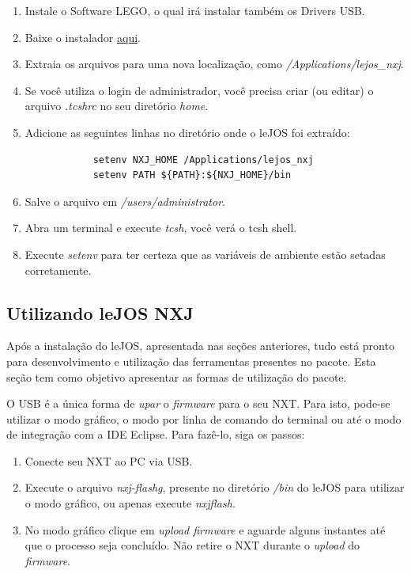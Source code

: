 	\begin{enumerate}
		\item Instale o Software LEGO, o qual irá instalar também os Drivers USB.
		\item Baixe o instalador \href{www.lejos.org}{aqui}.
		\item Extraia os arquivos para uma nova localização, como \textit{/Applications/lejos\_nxj}.
		\item Se você utiliza o login de administrador, você precisa criar (ou editar) o arquivo \textit{.tcshrc} no seu diretório \textit{home}.
		\item Adicione as seguintes linhas no diretório onde o leJOS foi extraído:
		\begin{lstlisting}
			setenv NXJ_HOME /Applications/lejos_nxj
			setenv PATH ${PATH}:${NXJ_HOME}/bin
		\end{lstlisting}
		\item Salve o arquivo em \textit{/users/administrator}.
		\item Abra um terminal e execute \textit{tcsh}, você verá o tcsh shell.
		\item Execute \textit{setenv} para ter certeza que as variáveis de ambiente estão setadas corretamente.
	\end{enumerate}

\subsection{Utilizando leJOS NXJ} %
\label{sub:utilizando_lejos_nxj}

	Após a instalação do leJOS, apresentada nas seções anteriores, tudo está pronto para desenvolvimento e utilização das ferramentas presentes no pacote. Esta seção tem como objetivo apresentar as formas de utilização do pacote.

	O USB é a única forma de \textit{upar} o \textit{firmware} para o seu NXT. Para isto, pode-se utilizar o modo gráfico, o modo por linha de comando do terminal ou até o modo de integração com a IDE Eclipse. Para fazê-lo, siga os passos:

	\begin{enumerate}
		\item Conecte seu NXT ao PC via USB.
		\item Execute o arquivo \textit{nxj-flashg}, presente no diretório \textit{/bin} do leJOS para utilizar o modo gráfico, ou apenas execute \textit{nxjflash}.
		\item No modo gráfico clique em \textit{upload firmware} e aguarde alguns instantes até que o processo seja concluído. Não retire o NXT durante o \textit{upload} do \textit{firmware}.
	\end{enumerate}

